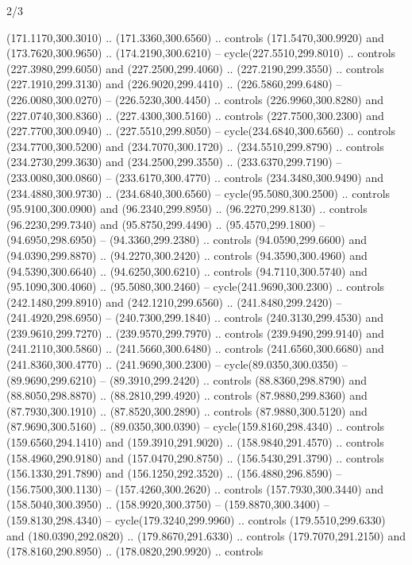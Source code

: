 \begin{flagdescription}{2/3}
\begin{scope}[xshift=0.5\flaglength,yshift=0.5\flagwidth,scale=\stretchfactor]
\begin{scope}[scale=0.001645\flagwidth,yshift=65mm,xshift=-63mm]
\begin{scope}[y=0.80pt, x=0.80pt, yscale=-1,]
\begin{scope}[cm={{1.33333,0.0,0.0,1.33333,(0.0,1e-05)}}]
  (171.1170,300.3010) .. (171.3360,300.6560) .. controls (171.5470,300.9920) and
  (173.7620,300.9650) .. (174.2190,300.6210) -- cycle(227.5510,299.8010) ..
  controls (227.3980,299.6050) and (227.2500,299.4060) .. (227.2190,299.3550) ..
  controls (227.1910,299.3130) and (226.9020,299.4410) .. (226.5860,299.6480) --
  (226.0080,300.0270) -- (226.5230,300.4450) .. controls (226.9960,300.8280) and
  (227.0740,300.8360) .. (227.4300,300.5160) .. controls (227.7500,300.2300) and
  (227.7700,300.0940) .. (227.5510,299.8050) -- cycle(234.6840,300.6560) ..
  controls (234.7700,300.5200) and (234.7070,300.1720) .. (234.5510,299.8790) ..
  controls (234.2730,299.3630) and (234.2500,299.3550) .. (233.6370,299.7190) --
  (233.0080,300.0860) -- (233.6170,300.4770) .. controls (234.3480,300.9490) and
  (234.4880,300.9730) .. (234.6840,300.6560) -- cycle(95.5080,300.2500) ..
  controls (95.9100,300.0900) and (96.2340,299.8950) .. (96.2270,299.8130) ..
  controls (96.2230,299.7340) and (95.8750,299.4490) .. (95.4570,299.1800) --
  (94.6950,298.6950) -- (94.3360,299.2380) .. controls (94.0590,299.6600) and
  (94.0390,299.8870) .. (94.2270,300.2420) .. controls (94.3590,300.4960) and
  (94.5390,300.6640) .. (94.6250,300.6210) .. controls (94.7110,300.5740) and
  (95.1090,300.4060) .. (95.5080,300.2460) -- cycle(241.9690,300.2300) ..
  controls (242.1480,299.8910) and (242.1210,299.6560) .. (241.8480,299.2420) --
  (241.4920,298.6950) -- (240.7300,299.1840) .. controls (240.3130,299.4530) and
  (239.9610,299.7270) .. (239.9570,299.7970) .. controls (239.9490,299.9140) and
  (241.2110,300.5860) .. (241.5660,300.6480) .. controls (241.6560,300.6680) and
  (241.8360,300.4770) .. (241.9690,300.2300) -- cycle(89.0350,300.0350) --
  (89.9690,299.6210) -- (89.3910,299.2420) .. controls (88.8360,298.8790) and
  (88.8050,298.8870) .. (88.2810,299.4920) .. controls (87.9880,299.8360) and
  (87.7930,300.1910) .. (87.8520,300.2890) .. controls (87.9880,300.5120) and
  (87.9690,300.5160) .. (89.0350,300.0390) -- cycle(159.8160,298.4340) ..
  controls (159.6560,294.1410) and (159.3910,291.9020) .. (158.9840,291.4570) ..
  controls (158.4960,290.9180) and (157.0470,290.8750) .. (156.5430,291.3790) ..
  controls (156.1330,291.7890) and (156.1250,292.3520) .. (156.4880,296.8590) --
  (156.7500,300.1130) -- (157.4260,300.2620) .. controls (157.7930,300.3440) and
  (158.5040,300.3950) .. (158.9920,300.3750) -- (159.8870,300.3400) --
  (159.8130,298.4340) -- cycle(179.3240,299.9960) .. controls
  (179.5510,299.6330) and (180.0390,292.0820) .. (179.8670,291.6330) .. controls
  (179.7070,291.2150) and (178.8160,290.8950) .. (178.0820,290.9920) .. controls

\end{scope}
\end{scope}
\end{scope}
\end{scope}
\end{flagdescription}
